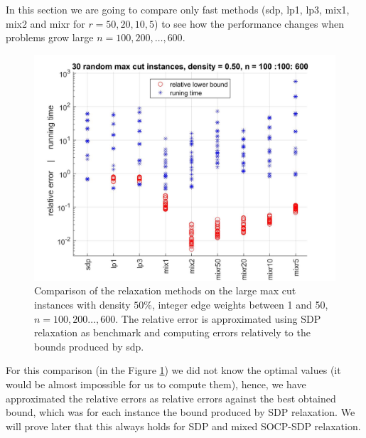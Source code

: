 \documentclass[12pt]{book}
\theoremstyle{definition}
\begin{document}
In this section we are going to compare only fast methods (sdp, lp1, lp3, mix1, mix2 and  mixr for $r=50,20,10,5$) to see how the performance changes when problems grow large $n=100, 200, \dots ,600$.
\begin{center}
\begin{figure}
\includegraphics[scale=0.27]{img/comp3.jpg}
\caption[Comparison of relaxations - large, dense instances of max cut 1]{Comparison of the relaxation methods on the large max cut instances with density  $50\%$, integer edge weights between 1 and 50, $n=100,200\dots ,600$. The relative error is approximated using SDP relaxation as benchmark and computing errors relatively to the bounds produced by sdp.} 
\label{comp3}
\end{figure}
\end{center}

For this comparison (in the Figure \ref{comp3}) we did not know the optimal values (it would be almost impossible for us to compute them), hence, we have approximated the relative errors as relative errors against the best obtained bound, which was for each instance the bound produced by SDP relaxation. We will prove later that this always holds for SDP and mixed SOCP-SDP relaxation.
\end{document}

